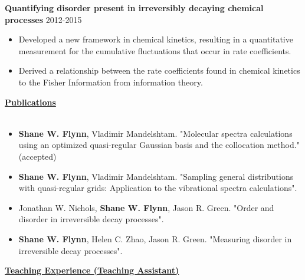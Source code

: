 \documentclass[letterpaper]{article}
\begin{document}
\textbf{Quantifying disorder present in irreversibly decaying chemical
processes}
\hfill 2012-2015
\begin{itemize}
    \item Developed a new framework in chemical kinetics, resulting in
    a quantitative measurement for the cumulative fluctuations that occur in rate
    coefficients.
    \vspace{-0.05in}
    \item Derived a relationship between the rate coefficients found in chemical
    kinetics to the Fisher Information from information theory.
\end{itemize}
{\large \textbf{\underline{Publications}}}\\
\vspace{-0.3in}\\
\begin{itemize}
    \item \textbf{Shane W. Flynn}, Vladimir Mandelshtam.
    "Molecular spectra calculations using an optimized quasi-regular Gaussian basis and the collocation method." (accepted)
    \vspace{-0.05in}
    \item \textbf{Shane W. Flynn}, Vladimir Mandelshtam.
    "Sampling general distributions with quasi-regular grids: Application to the
    vibrational spectra calculations".
    \vspace{-0.05in}
    \item Jonathan W. Nichols, \textbf{Shane W. Flynn}, Jason R.
    Green. "Order and disorder in irreversible decay processes".
    \vspace{-0.05in}
    \item \textbf{Shane W. Flynn}, Helen C. Zhao, Jason R. Green.
    "Measuring disorder in irreversible decay processes".
\end{itemize}
{\large \textbf{\underline{Teaching Experience (Teaching Assistant)}}}\\
\vspace{-0.3in}\\
\end{document}
